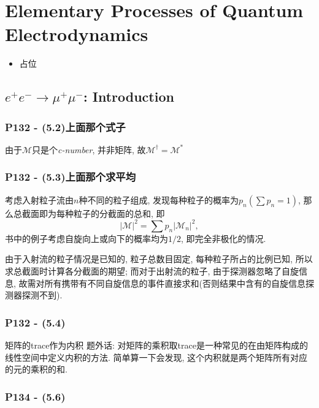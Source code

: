 \chapter{Elementary Processes of Quantum Electrodynamics}

\begin{itemize}
  \item 占位
\end{itemize}

\pagestyle{general}

\section{\texorpdfstring{$e^+e^- \rightarrow \mu^+\mu^-$}:: Introduction}

\subsection{P132 - (5.2)上面那个式子}

由于$\mathcal{M}$只是个\textit{c-number}, 并非矩阵, 故$\mathcal{M}^\dagger = \mathcal{M}^*$

\subsection{P132 - (5.3)上面那个求平均}

考虑入射粒子流由$n$种不同的粒子组成, 发现每种粒子的概率为$p_n(\sum p_n = 1)$, 那么总截面即为每种粒子的分截面的总和, 即
\begin{equation}
  |\mathcal{M}|^2 = \sum p_n |\mathcal{M}_n|^2,
\end{equation}
书中的例子考虑自旋向上或向下的概率均为$1/2$, 即完全非极化的情况.

由于入射流的粒子情况是已知的, 粒子总数目固定, 每种粒子所占的比例已知, 所以求总截面时计算各分截面的期望; 而对于出射流的粒子, 由于探测器忽略了自旋信息, 故需对所有携带有不同自旋信息的事件直接求和(否则结果中含有的自旋信息探测器探测不到).

\subsection{P132 - (5.4)}
\begin{mybox}{矩阵的trace作为内积}
  题外话: 对矩阵的乘积取trace是一种常见的在由矩阵构成的线性空间中定义内积的方法.
  简单算一下会发现, 这个内积就是两个矩阵所有对应的元的乘积的和.
\end{mybox}

\subsection{P134 - (5.6)}

